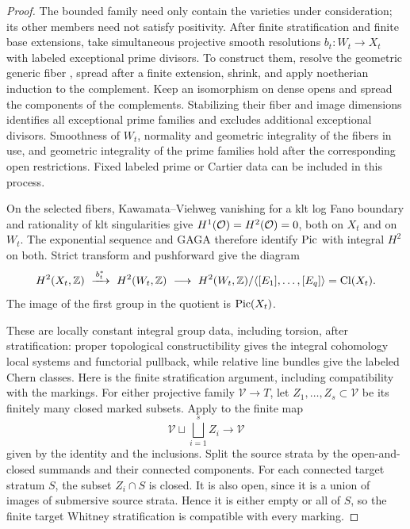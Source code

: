 \begin{proof}
The bounded family need only contain the varieties under
consideration; its other members need not satisfy positivity.
After finite stratification and finite base extensions, take
simultaneous projective smooth resolutions \(b_t:W_t\to X_t\)
with labeled exceptional prime divisors. To construct them,
resolve the geometric generic fiber
\cite[Theorems~1.0.1--1.0.3]{WlodarczykResolution}, spread after a
finite extension, shrink, and apply noetherian induction to the
complement. Keep an isomorphism on dense opens and spread the
components of the complements. Stabilizing their fiber and image
dimensions identifies all exceptional prime families and excludes
additional exceptional divisors. Smoothness of \(W_t\), normality
and geometric integrality of the fibers in use, and geometric
integrality of the prime families hold after the corresponding
open restrictions. Fixed labeled prime or Cartier data can be
included in this process.

On the selected fibers, Kawamata--Viehweg vanishing for a klt log
Fano boundary \cite[Theorem~3.2]{FujinoFundamental} and rationality
of klt singularities \cite[Theorem~0.1]{FujinoRational} give
\(H^1(\mathcal O)=H^2(\mathcal O)=0\), both on \(X_t\) and on \(W_t\).
The exponential sequence and GAGA
\cite[Section~12, Theorems~1--3; Section~20, Proposition~18]{SerreGAGA}
therefore identify \(\operatorname{Pic}\) with integral \(H^2\) on both. Strict transform and pushforward give the diagram
\[
 H^2(X_t,\mathbb Z)\ \xrightarrow{\,b_t^*\,}\ H^2(W_t,\mathbb Z)
 \ \longrightarrow\
 H^2(W_t,\mathbb Z)/\langle[E_1],\ldots,[E_q]\rangle=\operatorname{Cl}(X_t).
\]
The image of the first group in the quotient is \(\operatorname{Pic}(X_t)\).

These are locally constant integral group data, including torsion,
after stratification: proper topological constructibility gives
the integral cohomology local systems and functorial pullback,
while relative line bundles give the labeled Chern classes.
Here is the finite stratification argument, including compatibility
with the markings. For either projective family \(\mathcal V\to T\),
let \(Z_1,\ldots,Z_s\subset\mathcal V\) be its finitely many closed
marked subsets. Apply \cite[Theorem~3.2.3]{DeCataldoMiglioriniHodge}
to the finite map
\[
 \mathcal V\sqcup\bigsqcup_{i=1}^s Z_i\longrightarrow\mathcal V
\]
given by the identity and the inclusions. Split the source strata by
the open-and-closed summands and their connected components. For each
connected target stratum \(S\), the subset \(Z_i\cap S\) is closed.
It is also open, since it is a union of images of submersive source
strata. Hence it is either empty or all of \(S\), so the finite target
Whitney stratification is compatible with every marking.


\end{proof}
